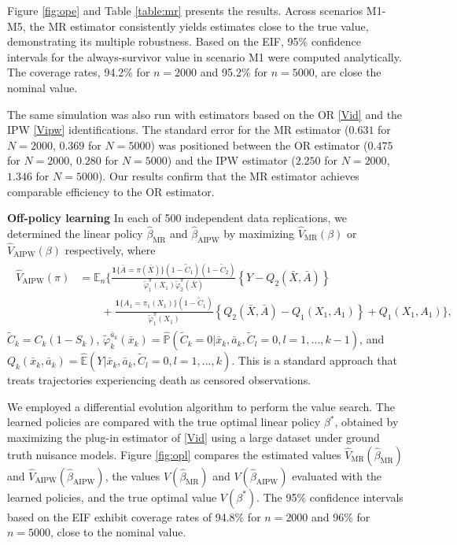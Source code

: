 \documentclass{article}
\newcommand{\wh}{\widehat}
\newcommand{\pk}{{\varphi}}
\newcommand{\pr}{\mathbb{P}}
\newcommand{\E}{\mathbb{E}}
\newcommand{\tred}{{}}   %
\begin{document}
Figure \ref{fig:ope} and Table \ref{table:mr} presents the results.
Across scenarios M1-M5, the MR estimator consistently yields estimates close to the true value, demonstrating its multiple robustness.
Based on the EIF, 95\% confidence intervals for the always-survivor value in scenario M1 were computed analytically. The coverage rates, 94.2\% for $n = 2000$ and 95.2\% for $n = 5000$, are close the nominal value.

\tred{
The same simulation was also run with estimators based on the OR \eqref{Vid} and the IPW \eqref{Vipw} identifications. 
The standard error for the MR estimator 
($0.631$ for $N=2000$, $0.369$ for $N=5000$) was positioned between the OR estimator 
($0.475$ for $N=2000$, $0.280$ for $N=5000$) and the IPW estimator 
($2.250$ for $N=2000$, $1.346$ for $N=5000$).  
Our results confirm that the MR estimator achieves comparable efficiency to the OR estimator.
}



\textbf{Off-policy learning} \;
In each of 500 independent data replications, we determined the linear policy $\hat\beta_\text{MR}$ and $\hat\beta_\text{AIPW}$ by maximizing $\wh V_\text{MR}(\beta)$ or $\wh V_\text{AIPW}(\beta)$ respectively, where
%
\begin{align}
\begin{split}
	\wh V_\text{AIPW}(\pi) 
	&= \E_n 
      \Big\{ 
        \frac{\mathbf1\{\bar A=\pi(\bar X)\}(1-\tilde C_1)(1-\tilde C_2)}{\tilde\pk_1^\pi(X_1) \tilde\pk_2^\pi(\bar X)} 
        \left\{Y - Q_2(\bar X, \bar A)\right\} \\
    &\qquad+ \frac{\mathbf1\{A_1=\pi_1(X_1)\}(1-\tilde C_1)}{\tilde\pk_1^\pi(X_1)} 
      \left\{ Q_2(\bar X, \bar A) - Q_1(X_1, A_1)\right\} +
         Q_1(X_1, A_1) \Big\},
\end{split} \label{Vaipw}
\end{align}
$\tilde C_k=C_k(1-S_k)$, $\tilde\pk_k^{\bar a_k}(\bar x_k) = \wh{\pr}(\tilde C_k = 0 | \bar x_k, \bar a_k, \tilde C_l=0, l=1,\dots,k-1)$, and $Q_k(\bar x_k, \bar a_k) = \wh{\E}(Y | \bar x_k, \bar a_k, \tilde C_l=0, l=1,\dots,k)$.
This is a standard approach that treats trajectories experiencing death as censored observations.

We employed a differential evolution algorithm to perform the value search.
The learned policies are compared with the true optimal linear policy $\beta^*$, obtained by maximizing the plug-in estimator of \eqref{Vid} using a large dataset %
	under ground truth nuisance models. 
Figure \ref{fig:opl} compares the estimated values $\wh V_\text{MR}(\hat\beta_\text{MR})$ and $\wh V_\text{AIPW}(\hat\beta_\text{AIPW})$, the values $V(\hat\beta_\text{MR})$ and $V(\hat\beta_\text{AIPW})$ evaluated with the learned policies, and the true optimal value $V(\beta^*)$. 
The 95\% confidence intervals based on the EIF exhibit coverage rates of 94.8\% for $n = 2000$ and 96\% for $n = 5000$, close to the nominal value.
\end{document}
